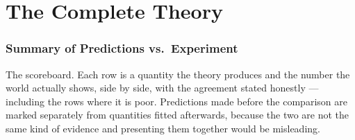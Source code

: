 \documentclass[12pt,a4paper]{article}
\theoremstyle{definition}
\begin{document}
\part{The Complete Theory}

\section{Summary of Predictions vs.\ Experiment}

\begin{plainbox}
The scoreboard. Each row is a quantity the theory produces and the number the world
actually shows, side by side, with the agreement stated honestly --- including the rows
where it is poor. Predictions made before the comparison are marked separately from
quantities fitted afterwards, because the two are not the same kind of evidence and
presenting them together would be misleading.
\end{plainbox}

\label{sec:summary}
\end{document}
